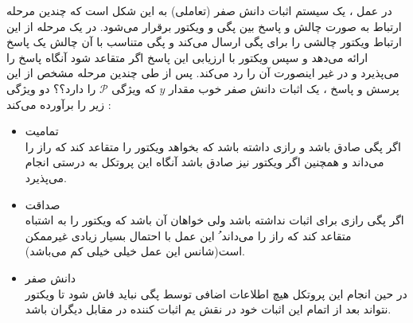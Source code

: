 \documentclass[12pt,a4paper]{article}
\begin{document}
در عمل ، یک سیستم اثبات دانش صفر (تعاملی) به این شکل است که چندین مرحله ارتباط به صورت چالش و پاسخ بین پگی و ویکتور برقرار می‌شود. در یک مرحله از این ارتباط ویکتور چالشی را برای پگی ارسال می‌کند و پگی متناسب با آن چالش یک پاسخ ارائه می‌دهد و سپس ویکتور با ارزیابی این پاسخ اگر متقاعد شود آنگاه پاسخ را می‌پذیرد و در غیر اینصورت آن را رد می‌کند. پس از طی چندین مرحله مشخص از این پرسش و پاسخ ، یک اثبات دانش صفر خوب مقدار
$y$
که ویژگی
$\mathcal{P}$
را دارد؟؟ دو ویژگی زیر را برآورده می‌کند :
\begin{itemize}
	
\item {تمامیت}
\\
	اگر پگی صادق باشد و رازی داشته باشد که بخواهد ویکتور را متقاعد کند که راز را می‌داند و همچنین اگر ویکتور نیز صادق باشد آنگاه این پروتکل به درستی انجام می‌پذیرد.
	
\item {صداقت}
\\
	اگر پگی رازی برای اثبات نداشته باشد ولی خواهان آن باشد که ویکتور را به اشتباه متقاعد کند که راز را می‌داند ُ این عمل با احتمال بسیار زیادی غیرممکن است(شانس این عمل خیلی خیلی کم می‌باشد).

\item {دانش صفر}
\\
در حین انجام این پروتکل هیچ اطلاعات اضافی توسط پگی نباید فاش شود تا ویکتور نتواند بعد از اتمام این اثبات خود در نقش یم اثبات کننده در مقابل دیگران باشد.	
\end{itemize}
\end{document}
